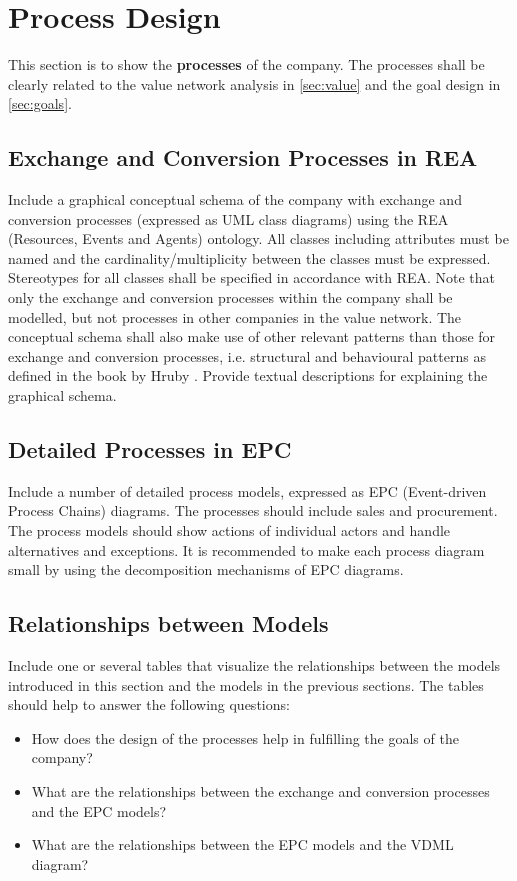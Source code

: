 
\section{Process Design} \label{sec:processes}

This section is to show the \textbf{processes} of the company.
The processes shall be clearly related to the value network analysis in \autoref{sec:value} and the goal design in
\autoref{sec:goals}.

\subsection{Exchange and Conversion Processes in REA}

Include a graphical conceptual schema of the company with exchange and conversion processes (expressed as UML class diagrams)
using the REA (Resources, Events and Agents) ontology.
All classes including attributes must be named and the cardinality/multiplicity between the classes must be expressed.
Stereotypes for all classes shall be specified in accordance with REA.
Note that only the exchange and conversion processes within the company shall be modelled, but not processes in other companies in
the value network.
The conceptual schema shall also make use of other relevant patterns than those for exchange and conversion processes, i.e.
structural and behavioural patterns as defined in the book by Hruby \cite{Hruby2006_BusinessPatterns}.
Provide textual descriptions for explaining the graphical schema.

\subsection{Detailed Processes in EPC}

Include a number of detailed process models, expressed as EPC (Event-driven Process Chains) diagrams.
The processes should include sales and procurement.
The process models should show actions of individual actors and handle alternatives and exceptions.
It is recommended to make each process diagram small by using the decomposition mechanisms of EPC diagrams.

\subsection{Relationships between Models}

Include one or several tables that visualize the relationships between the models introduced in this section and the models in the
previous sections.
The tables should help to answer the following questions:
\begin{itemize}
  \item How does the design of the processes help in fulfilling the goals of the company?
  \item What are the relationships between the exchange and conversion processes and the EPC models?
  \item What are the relationships between the EPC models and the VDML diagram?
\end{itemize}
